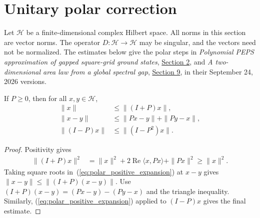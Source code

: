 \section{Unitary polar correction}
\label{sec:polar_unitary_correction}

Let $\mathcal H$ be a finite-dimensional complex Hilbert space. All norms
in this section are vector norms. The operator $D:\mathcal H\to\mathcal H$
may be singular, and the vectors need not be normalized. The estimates below
give the polar steps in
\emph{Polynomial PEPS approximation of gapped square-grid ground states},
\href{https://github.com/openai/math/blob/adc7f1241b42e322a6451854ab7e4b4c146bf78a/preprints/Polynomial-PEPS-approximation-of-gapped-square-grid-ground-states-September-24-2026/build/sections/02-information.tex\#L565-L595}{Section 2},
and \emph{A two-dimensional area law from a global spectral gap},
\href{https://github.com/openai/math/blob/adc7f1241b42e322a6451854ab7e4b4c146bf78a/preprints/A-two-dimensional-area-law-from-a-global-spectral-gap-September-24-2026/build/sections/09-amplification.tex\#L524-L545}{Section 9},
in their September 24, 2026 versions.

\begin{theorem}
    \label{thm:positive_two_residuals}
    \leanok
    If $P\ge0$, then for all $x,y\in\mathcal H$,
    \begin{align}
        \|x\|      & \le\|(I+P)x\|,        \\
        \|x-y\|    & \le\|Px-y\|+\|Py-x\|, \\
        \|(I-P)x\| & \le\|(I-P^2)x\|.
    \end{align}
\end{theorem}
\begin{proof}
    \leanok
    Positivity gives
    \begin{align}
        \|(I+P)x\|^2
         & =\|x\|^2+2\operatorname{Re}\langle x,Px\rangle+\|Px\|^2
        \ge\|x\|^2.
        \label{eq:polar_positive_expansion}
    \end{align}
    Taking square roots in~(\ref{eq:polar_positive_expansion}) at $x-y$ gives
    $\|x-y\|\le\|(I+P)(x-y)\|$. Use
    $(I+P)(x-y)=(Px-y)-(Py-x)$ and the triangle inequality.
    Similarly, (\ref{eq:polar_positive_expansion}) applied to $(I-P)x$
    gives the final estimate.
\end{proof}

